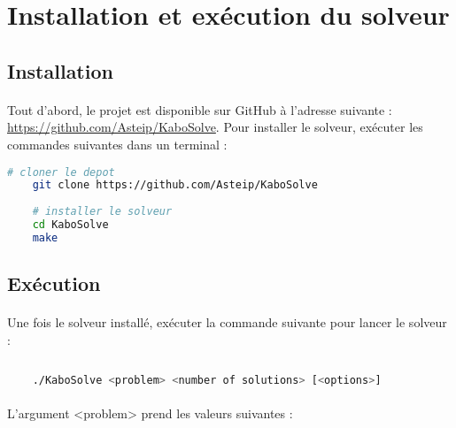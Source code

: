 \section{Installation et exécution du solveur}

\subsection{Installation}
    \paragraph{}
    Tout d'abord, le projet est disponible sur GitHub à l'adresse suivante :  \url{https://github.com/Asteip/KaboSolve}. Pour installer le solveur, exécuter les commandes suivantes dans un terminal :
    
    \begin{lstlisting}[language=bash,captionpos=b]
    # cloner le depot
    git clone https://github.com/Asteip/KaboSolve
    
    # installer le solveur
    cd KaboSolve
    make
    \end{lstlisting}
    
\subsection{Exécution}
    \paragraph{}
    Une fois le solveur installé, exécuter la commande suivante pour lancer le solveur :
    
    \begin{lstlisting}[language=bash,captionpos=b]
    
    ./KaboSolve <problem> <number of solutions> [<options>]

    \end{lstlisting}
    
    \paragraph{}
    L'argument <problem> prend les valeurs suivantes : 
    
